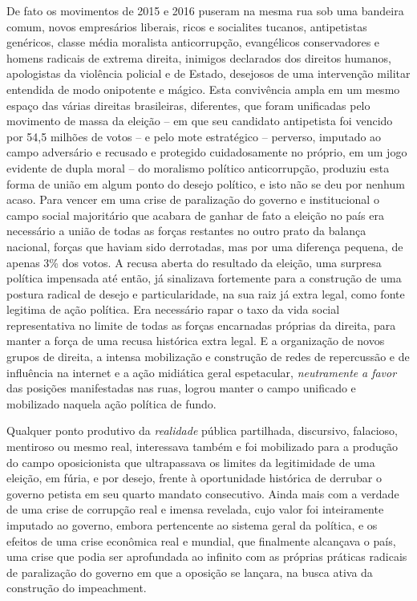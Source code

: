 De fato os movimentos de 2015 e 2016 puseram na mesma rua sob uma
bandeira comum, novos empresários liberais, ricos e socialites tucanos,
antipetistas genéricos, classe média moralista anticorrupção,
evangélicos conservadores e homens radicais de extrema direita, inimigos
declarados dos direitos humanos, apologistas da violência policial e de
Estado, desejosos de uma intervenção militar entendida de modo
onipotente e mágico. Esta convivência ampla em um mesmo espaço das
várias direitas brasileiras, diferentes, que foram unificadas pelo
movimento de massa da eleição -- em que seu candidato antipetista foi
vencido por 54,5 milhões de votos -- e pelo mote estratégico --
perverso, imputado ao campo adversário e recusado e protegido
cuidadosamente no próprio, em um jogo evidente de dupla moral -- do
moralismo político anticorrupção, produziu esta forma de união em algum
ponto do desejo político, e isto não se deu por nenhum acaso. Para
vencer em uma crise de paralização do governo e institucional o campo
social majoritário que acabara de ganhar de fato a eleição no país era
necessário a união de todas as forças restantes no outro prato da
balança nacional, forças que haviam sido derrotadas, mas por uma
diferença pequena, de apenas 3\% dos votos. A recusa aberta do resultado
da eleição, uma surpresa política impensada até então, já sinalizava
fortemente para a construção de uma postura radical de desejo e
particularidade, na sua raiz já extra legal, como fonte legitima de ação
política. Era necessário rapar o taxo da vida social representativa no
limite de todas as forças encarnadas próprias da direita, para manter a
força de uma recusa histórica extra legal. E a organização de novos
grupos de direita, a intensa mobilização e construção de redes de
repercussão e de influência na internet e a ação midiática geral
espetacular, \emph{neutramente} \emph{a favor} das posições manifestadas
nas ruas, logrou manter o campo unificado e mobilizado naquela ação
política de fundo.

Qualquer ponto produtivo da \emph{realidade} pública partilhada,
discursivo, falacioso, mentiroso ou mesmo real, interessava também e foi
mobilizado para a produção do campo oposicionista que ultrapassava os
limites da legitimidade de uma eleição, em fúria, e por desejo, frente à
oportunidade histórica de derrubar o governo petista em seu quarto
mandato consecutivo. Ainda mais com a verdade de uma crise de corrupção
real e imensa revelada, cujo valor foi inteiramente imputado ao governo,
embora pertencente ao sistema geral da política, e os efeitos de uma
crise econômica real e mundial, que finalmente alcançava o país, uma
crise que podia ser aprofundada ao infinito com as próprias práticas
radicais de paralização do governo em que a oposição se lançara, na
busca ativa da construção do impeachment.

